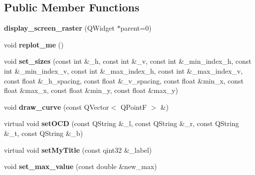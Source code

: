 \subsection*{Public Member Functions}
\begin{DoxyCompactItemize}
\item 
\mbox{\label{classdisplay__screen__raster_a045c1bd61ae9dedad1600568f8db18c1}} 
{\bfseries display\+\_\+screen\+\_\+raster} (Q\+Widget $\ast$parent=0)
\item 
\mbox{\label{classdisplay__screen__raster_ab148d22834c5bb1c69087cd64388b1fc}} 
void {\bfseries replot\+\_\+me} ()
\item 
\mbox{\label{classdisplay__screen__raster_ac800eb58bc8e9c2cbb8b9481fc3b38cf}} 
void {\bfseries set\+\_\+sizes} (const int \&\+\_\+h, const int \&\+\_\+v, const int \&\+\_\+min\+\_\+index\+\_\+h, const int \&\+\_\+min\+\_\+index\+\_\+v, const int \&\+\_\+max\+\_\+index\+\_\+h, const int \&\+\_\+max\+\_\+index\+\_\+v, const float \&\+\_\+h\+\_\+spacing, const float \&\+\_\+v\+\_\+spacing, const float \&min\+\_\+x, const float \&max\+\_\+x, const float \&min\+\_\+y, const float \&max\+\_\+y)
\item 
\mbox{\label{classdisplay__screen__raster_a4a5d5ee25ba19ff6b7773674325d13ff}} 
void {\bfseries draw\+\_\+curve} (const Q\+Vector$<$ Q\+PointF $>$ \&)
\item 
\mbox{\label{classdisplay__screen__raster_ac0bebdf7c91a9a14295960cc837b4989}} 
virtual void {\bfseries set\+O\+CD} (const Q\+String \&\+\_\+l, const Q\+String \&\+\_\+r, const Q\+String \&\+\_\+t, const Q\+String \&\+\_\+b)
\item 
\mbox{\label{classdisplay__screen__raster_a3a06d6a7a37ae3ceac4a251e5cea5f2a}} 
virtual void {\bfseries set\+My\+Title} (const qint32 \&\+\_\+label)
\item 
\mbox{\label{classdisplay__screen__raster_aa715e923b2f425f878011f34f3efa148}} 
void {\bfseries set\+\_\+max\+\_\+value} (const double \&new\+\_\+max)
\item 

\end{DoxyCompactItemize}
